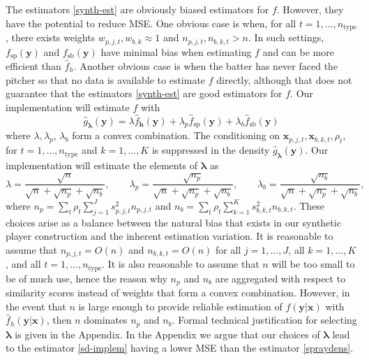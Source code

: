 \documentclass[12pt]{article}
\newcommand{\y}{\textbf{y}}
\newcommand{\x}{\textbf{x}}
\newcommand{\h}{\textbf{h}}
\newcommand{\lambdabf}{\boldsymbol{\lambda}}
\begin{document}
The estimators \eqref{synth-est} are obviously biased estimators for $f$. However, they have the potential to reduce MSE. One obvious case is when, for all
$t = 1,\ldots,n_{\text{type}}$, there exists weights
$w_{p,j,t}, w_{b,k} \approx 1$ and
$n_{p,j,t}, n_{b,k,t} > n$.
In such settings, $f_{\text{sp}}(\y)$ and $f_{\text{sb}}(\y)$ have minimal bias when estimating $f$ and can be more efficient than $\hat f_h$. Another obvious case is when the batter has never faced the pitcher so that no data is available to estimate $f$ directly, although that does not guarantee that the estimators \eqref{synth-est} are good estimators for $f$. Our implementation will estimate $f$ with
\begin{equation} \label{sd-implem}
  \hat{g}_{\lambdabf}(\y) = \lambda \hat f_\h(\y)
    + \lambda_p \hat f_{\text{sp}}(\y)
    + \lambda_b \hat f_{\text{sb}}(\y)
\end{equation}
where $\lambda,\lambda_p$, $\lambda_b$ form a convex combination. The conditioning on $\x_{p,j,t}, \x_{b,k,t}, \rho_t$, for $t = 1,\ldots,n_{\text{type}}$ and $k = 1,\ldots,K$ is suppressed in the density $\hat{g}_{\lambdabf}(\y)$.
Our implementation will estimate the elements of $\lambdabf$ as
$$
  \lambda = \frac{\sqrt{n}}{\sqrt{n} + \sqrt{n_p} + \sqrt{n_b}}, \qquad
  \lambda_p = \frac{\sqrt{n_p}}{\sqrt{n} + \sqrt{n_p} + \sqrt{n_b}}, \qquad
  \lambda_b = \frac{\sqrt{n_b}}{\sqrt{n} + \sqrt{n_p} + \sqrt{n_b}},
$$
where $n_p = \sum_t\rho_t\sum_{j=1}^J s_{p,j,t}^2n_{p,j,t}$ and
$n_b = \sum_t\rho_t\sum_{k=1}^K s_{b,k,t}^2n_{b,k,t}$.  These choices arise as a balance between the natural bias that exists in our synthetic player construction and the inherent estimation variation. %
It is reasonable to assume that $n_{p,j,t} = O(n)$ and $n_{b,k,t} = O(n)$ for all $j = 1,\ldots,J$, all $k = 1,\ldots,K$, and all $t = 1,\ldots,n_{\text{type}}$. It is also reasonable to assume that $n$ will be too small to be of much use, hence the reason why $n_p$ and $n_b$ are aggregated with respect to similarity scores instead of weights that form a convex combination. However, in the event that $n$ is large enough to provide reliable estimation of $f(\y|\x)$ with $\hat f_h(\y|\x)$, then $n$ dominates $n_p$ and $n_b$. Formal technical justification for selecting $\lambdabf$ is given in the Appendix. In the Appendix we argue that our choices of $\lambdabf$ lead to the estimator \eqref{sd-implem} having a lower MSE than the estimator \eqref{spraydens}.
\end{document}
